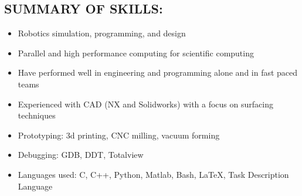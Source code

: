 \documentclass[margin]{res}
\begin{document}
  

\address{\bf Current\\ 42 Colvin Circle  \\   Troy, NY 12180  \\ {\bf phone: }(720) 270-3901 \\ {\bf email: }micahcorah@gmail.com}
\address{\bf Permanent\\ 3361 E. Maplewood Ave. \\   Centennial, CO 80121}

\begin{resume}                        
\vspace{-1.5mm}
\section{SUMMARY OF SKILLS:}
\vspace{10mm}
  \begin{itemize}
    \item Robotics simulation, programming, and design
    \item Parallel and high performance computing for scientific computing
    \item Have performed well in engineering and programming alone and in fast paced teams
    \item Experienced with CAD (NX and Solidworks) with a focus on surfacing techniques
    \item Prototyping: 3d printing, CNC milling, vacuum forming
    \item Debugging: GDB, DDT, Totalview
    \item Languages used: C, C++, Python, Matlab, Bash, \LaTeX, Task Description Language
	\end{itemize}
\vspace{-3.5mm}

\end{resume}
\end{document}
